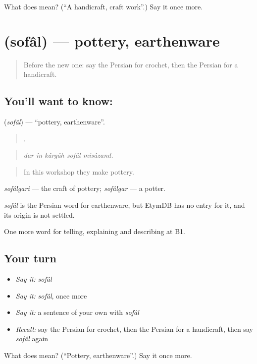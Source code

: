 \begin{tcolorbox}[breakable,colback=teal!4,colframe=teal!35!black,title={Before you move on}]
What does  mean? (\textquotedblleft{}A handicraft, craft work\textquotedblright{}.) Say it once more.
\end{tcolorbox}
\section[\texorpdfstring{\fa{سفال} (sofâl)}{سفال (sofâl)}]{ (sofâl) — pottery, earthenware}

\label{lesson:FA-C508-sofal}



\begin{quote}
Before the new one: say the Persian for crochet, then the Persian for a handicraft.
\end{quote}

\subsection*{You'll want to know: }
\textbf{} (\emph{sofâl}) — \textquotedblleft{}pottery, earthenware\textquotedblright{}.

\begin{quote}
    .
\end{quote}

\begin{quote}
\emph{dar in kârgâh sofâl misâzand.}
\end{quote}

\begin{quote}
In this workshop they make pottery.
\end{quote}

\emph{sofâlgari} — the craft of pottery; \emph{sofâlgar} — a potter.

\begin{cousinweb}
\emph{sofâl} is the Persian word for earthenware, but EtymDB has no entry for it, and its origin is not settled.
\end{cousinweb}

\begin{grammarlens}[title={What you've built}]
One more word for telling, explaining and describing at B1.
\end{grammarlens}

\subsection*{Your turn}
\begin{itemize}
\raggedright
  \item \emph{Say it:} \emph{sofâl}
  \item \emph{Say it:} \emph{sofâl}, once more
  \item \emph{Say it:} a sentence of your own with \emph{sofâl}
  \item \emph{Recall:} say the Persian for crochet, then the Persian for a handicraft, then say \emph{sofâl} again
\end{itemize}

\begin{tcolorbox}[breakable,colback=teal!4,colframe=teal!35!black,title={Before you move on}]
What does  mean? (\textquotedblleft{}Pottery, earthenware\textquotedblright{}.) Say it once more.
\end{tcolorbox}
